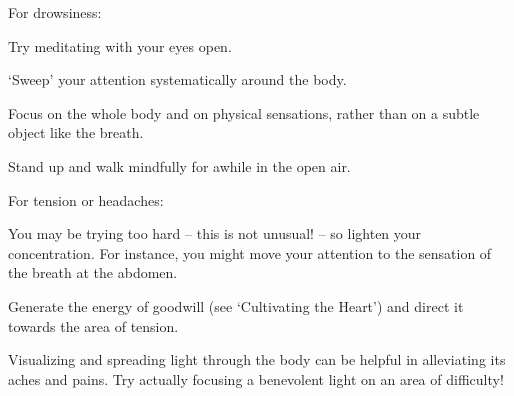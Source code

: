 \newpage

For drowsiness:
\begin{packeditemize}
\item
  Try meditating with your eyes open.
\item
  `Sweep' your attention systematically around the body.
\item
  Focus on the whole body and on physical sensations, rather than on a
  subtle object like the breath.
\item
  Stand up and walk mindfully for awhile in the open air.
\end{packeditemize}

For tension or headaches:
\begin{packeditemize}
\item
  You may be trying too hard -- this is not unusual! -- so lighten your
  concentration. For instance, you might move your attention to the
  sensation of the breath at the abdomen.
\item
  Generate the energy of goodwill (see `Cultivating the Heart') and
  direct it towards the area of tension.
\item
  Visualizing and spreading light through the body can be helpful in
  alleviating its aches and pains. Try actually focusing a benevolent
  light on an area of difficulty!
\end{packeditemize}

